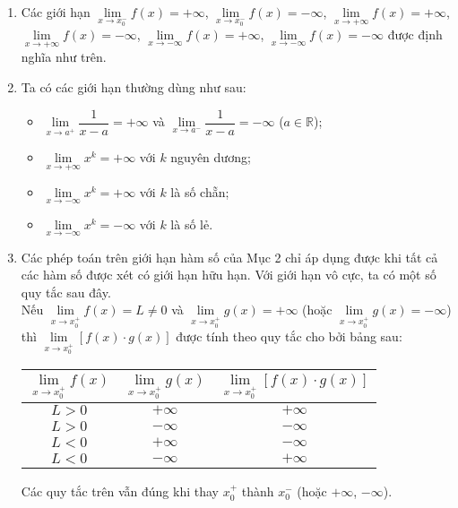\begin{tomtat}
	\begin{note}
		\begin{enumerate}
			\item Các giới hạn $ \lim \limits_{x \to x_0^-} f(x)=+\infty $, $ \lim \limits_{x \to x_0^-} f(x)=-\infty $, $ \lim \limits_{x \to +\infty} f(x)=+\infty $, $ \lim \limits_{x \to +\infty} f(x)=-\infty $, $ \lim \limits_{x \to -\infty} f(x)=+\infty $, $ \lim \limits_{x \to -\infty} f(x)=-\infty $ được định nghĩa như trên.
			\item Ta có các giới hạn thường dùng như sau:
			\begin{itemize}
				\item $ \lim \limits_{x \to a^+} \dfrac{1}{x-a}=+\infty $ và $ \lim \limits_{x \to a^-}\dfrac{1}{x-a}=-\infty $ ($ a\in \mathbb{R} $);
				\item $ \lim \limits_{x \to +\infty}x^k=+\infty $ với $ k $ nguyên dương;
				\item $ \lim \limits_{x \to -\infty}x^k=+\infty $ với $ k $ là số chẵn;
				\item $ \lim \limits_{x \to -\infty}x^k=-\infty $ với $ k $ là số lẻ.
			\end{itemize}
			\item Các phép toán trên giới hạn hàm số của Mục 2 chỉ áp dụng được khi tất cả các hàm số được xét có giới hạn hữu hạn. Với giới hạn vô cực, ta có một số quy tắc sau đây.\\
			Nếu $ \lim \limits_{x \to x_0^+} f(x)=L\neq 0 $ và $ \lim \limits_{x \to x_0^+} g(x)=+\infty $ (hoặc $ \lim \limits_{x \to x_0^+} g(x)=-\infty $) thì $ \lim \limits_{x \to x_0^+}[f(x)\cdot g(x)] $ được tính theo quy tắc cho bởi bảng sau:
			\begin{center}
				\begin{tabular}{|c|c|c|}
					\hline 
					$ \lim \limits_{x \to x_0^+} f(x) $	& $  \lim \limits_{x \to x_0^+} g(x) $&$ \lim \limits_{x \to x_0^+} [f(x)\cdot g(x)] $  \\ 
					\hline 
					$ L>0 $	&$ +\infty $  &$ +\infty $  \\ 
					\hline 
					$ L>0 $	&$ -\infty $ &$ -\infty $  \\ 
					\hline 
					$ L<0 $&  $ +\infty $&  $ -\infty $\\ 
					\hline 
					$ L<0 $& $ -\infty $ &$ +\infty $  \\ 
					\hline 
				\end{tabular} 
			\end{center}
			Các quy tắc trên vẫn đúng khi thay $ x_0^+ $ thành $ x_0^- $ (hoặc $ +\infty $, $ -\infty $).
		\end{enumerate}
	\end{note}
\end{tomtat}


